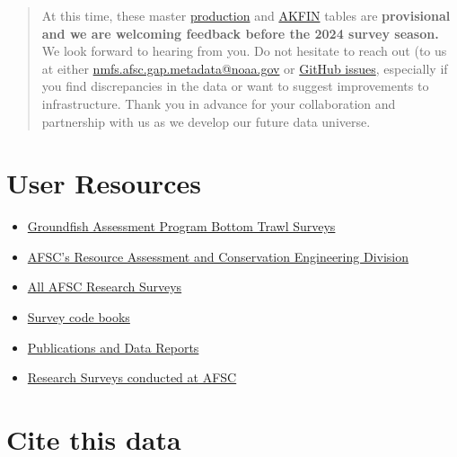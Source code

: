 \documentclass[
  letterpaper,
  oneside,
  open=any]{scrbook}
\providecommand{\tightlist}{%
  \setlength{\itemsep}{0pt}\setlength{\parskip}{0pt}}\usepackage{longtable,booktabs,array}
\begin{document}
\begin{quote}
At this time, these master
\href{https://afsc-gap-products.github.io/gap_products/content/product-intro.html}{production}
and
\href{https://afsc-gap-products.github.io/gap_products/content/akfin-intro.html}{AKFIN}
tables are \textbf{provisional and we are welcoming feedback before the
2024 survey season.} We look forward to hearing from you. Do not
hesitate to reach out (to us at either
\url{nmfs.afsc.gap.metadata@noaa.gov} or
\href{https://github.com/afsc-gap-products/gap_products/issues}{GitHub
issues}, especially if you find discrepancies in the data or want to
suggest improvements to infrastructure. Thank you in advance for your
collaboration and partnership with us as we develop our future data
universe.
\end{quote}

\section*{User Resources}\label{user-resources}


\begin{itemize}
\tightlist
\item
  \href{https://www.fisheries.noaa.gov/alaska/science-data/groundfish-assessment-program-bottom-trawl-surveys}{Groundfish
  Assessment Program Bottom Trawl Surveys}
\item
  \href{https://www.fisheries.noaa.gov/about/resource-assessment-and-conservation-engineering-division}{AFSC's
  Resource Assessment and Conservation Engineering Division}
\item
  \href{https://www.fisheries.noaa.gov/alaska/ecosystems/alaska-fish-research-surveys}{All
  AFSC Research Surveys}
\item
  \href{https://www.fisheries.noaa.gov/resource/document/groundfish-survey-species-code-manual-and-data-codes-manual}{Survey
  code books}
\item
  \href{https://repository.library.noaa.gov/}{Publications and Data
  Reports}
\item
  \href{https://www.fisheries.noaa.gov/alaska/ecosystems/alaska-fish-research-surveys}{Research
  Surveys conducted at AFSC}
\end{itemize}

\section*{Cite this data}\label{cite-this-data}
\end{document}
